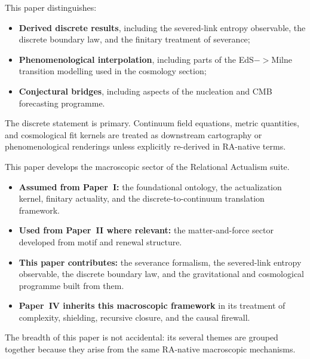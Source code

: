 \documentclass[11pt]{article}
\def\to{->}%
\begin{document}
\begin{tcolorbox}[title=Epistemic Status of Results in This Paper,colback=gray!5,colframe=gray!60]
This paper distinguishes:
\begin{itemize}[nosep]
    \item \textbf{Derived discrete results}, including the severed-link entropy observable, the discrete boundary law, and the finitary treatment of severance;
    \item \textbf{Phenomenological interpolation}, including parts of the EdS$\to$Milne transition modelling used in the cosmology section;
    \item \textbf{Conjectural bridges}, including aspects of the nucleation and CMB forecasting programme.
\end{itemize}
The discrete statement is primary. Continuum field equations, metric quantities, and cosmological fit kernels are treated as downstream cartography or phenomenological renderings unless explicitly re-derived in RA-native terms.
\end{tcolorbox}

\begin{tcolorbox}[title=Place of This Paper in the RA Suite,colback=gray!5,colframe=gray!60]
This paper develops the macroscopic sector of the Relational Actualism suite.
\begin{itemize}[nosep]
    \item \textbf{Assumed from Paper~I:} the foundational ontology, the actualization kernel, finitary actuality, and the discrete-to-continuum translation framework.
    \item \textbf{Used from Paper~II where relevant:} the matter-and-force sector developed from motif and renewal structure.
    \item \textbf{This paper contributes:} the severance formalism, the severed-link entropy observable, the discrete boundary law, and the gravitational and cosmological programme built from them.
    \item \textbf{Paper~IV inherits this macroscopic framework} in its treatment of complexity, shielding, recursive closure, and the causal firewall.
\end{itemize}
The breadth of this paper is not accidental: its several themes are grouped together because they arise from the same RA-native macroscopic mechanisms.
\end{tcolorbox}
\end{document}
